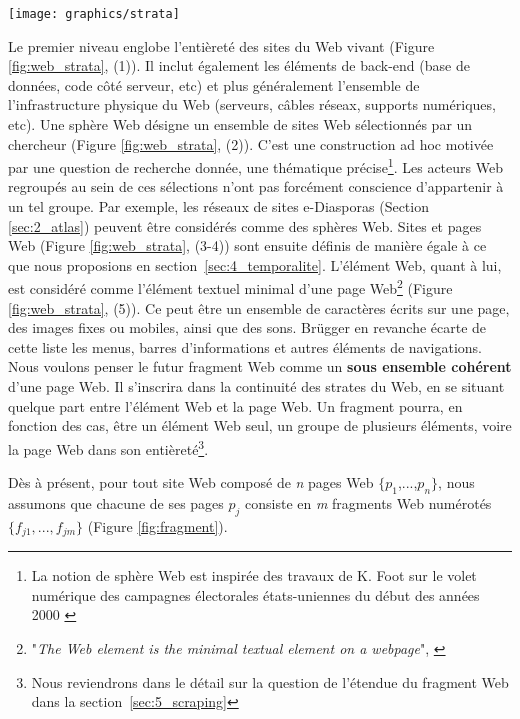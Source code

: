 \documentclass[symmetric,justified,marginals=raggedouter]{tufte-book}
\begin{document}
\begin{figure*}
  \centering
  \texttt{[image: graphics/strata]}
  \caption{Les 5 strates analytiques du Web, d'après \citep{brugger_website_2009}}
  \label{fig:web_strata}
\end{figure*} 

\noindent Le premier niveau englobe l'entièreté des sites du Web vivant (Figure \ref{fig:web_strata}, (1)). Il inclut également les éléments de back-end (base de données, code côté serveur, etc) et plus généralement l'ensemble de l'infrastructure physique du Web (serveurs, câbles réseax, supports numériques, etc). Une sphère Web désigne un ensemble de sites Web sélectionnés par un chercheur (Figure \ref{fig:web_strata}, (2)). C'est une construction ad hoc motivée par une question de recherche donnée, une thématique précise\footnote{La notion de sphère Web est inspirée des travaux de K. Foot sur le volet numérique des campagnes électorales états-uniennes du début des années 2000 \citep{foot_web_2006}}. Les acteurs Web regroupés au sein de ces sélections n'ont pas forcément conscience d'appartenir à un tel groupe. Par exemple, les réseaux de sites e-Diasporas (Section \ref{sec:2_atlas}) peuvent être considérés comme des sphères Web. Sites et pages Web (Figure \ref{fig:web_strata}, (3-4)) sont ensuite définis de manière égale à ce que nous proposions en section~\ref{sec:4_temporalite}. L'élément Web, quant à lui, est considéré comme l'élément textuel minimal d'une page Web\footnote{"\textit{The Web element is the minimal textual element on a webpage}", \citep[p.20]{brugger_website_2009}} (Figure \ref{fig:web_strata}, (5)). Ce peut être un ensemble de caractères écrits sur une page, des images fixes ou mobiles, ainsi que des sons. Brügger en revanche écarte de cette liste les menus, barres d'informations et autres éléments de navigations. \\

\noindent Nous voulons penser le futur fragment Web comme un \textbf{sous ensemble cohérent} d'une page Web. Il s'inscrira dans la continuité des strates du Web, en se situant quelque part entre l'élément Web et la page Web. Un fragment pourra, en fonction des cas, être un élément Web seul, un groupe de plusieurs éléments, voire la page Web dans son entièreté\footnote{Nous reviendrons dans le détail sur la question de l'étendue du fragment Web dans la section~\ref{sec:5_scraping}}. 

Dès à présent, pour tout site Web composé de \textit{n} pages Web $\{p_1$,...,$p_n\}$, nous assumons que chacune de ses pages $p_j$ consiste en \textit{m} fragments Web numérotés $\{f_{j1},...,f_{jm}\}$ (Figure \ref{fig:fragment}).
\end{document}
